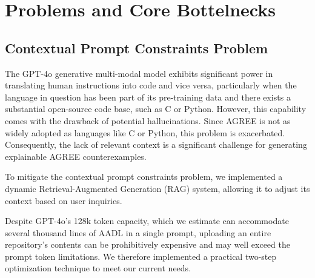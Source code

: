 
\section{Problems and Core Bottelnecks}
\subsection{Contextual Prompt Constraints Problem}

The GPT-4o generative multi-modal model exhibits significant power in translating human instructions into code and vice versa, particularly when the language in question has been part of its pre-training data and there exists a substantial open-source code base, such as C or Python. However, this capability comes with the drawback of potential hallucinations. Since AGREE is not as widely adopted as languages like C or Python, this problem is exacerbated. 
Consequently, the lack of relevant context is a significant challenge for generating explainable AGREE counterexamples. 

To mitigate the contextual prompt constraints problem, we implemented a dynamic Retrieval-Augmented Generation (RAG) system, allowing it to adjust its context based on user inquiries.

Despite GPT-4o's 128k token capacity, which we estimate can accommodate several thousand lines of AADL in a single prompt, uploading an entire repository's contents can be prohibitively expensive and may well exceed the prompt token limitations. We therefore implemented a practical two-step optimization technique to meet our current needs.

